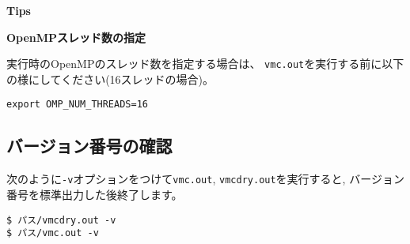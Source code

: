 \begin{screen}
\Large 
{\bf Tips}
\normalsize

{\bf OpenMPスレッド数の指定}

実行時のOpenMPのスレッド数を指定する場合は、
\verb|vmc.out|を実行する前に以下の様にしてください(16スレッドの場合)。
\begin{verbatim}
export OMP_NUM_THREADS=16
\end{verbatim}

\end{screen}

\subsection{バージョン番号の確認}

次のように\verb|-v|オプションをつけて\verb|vmc.out|, \verb|vmcdry.out|を実行すると, 
バージョン番号を標準出力した後終了します。

\begin{verbatim}
$ パス/vmcdry.out -v
$ パス/vmc.out -v
\end{verbatim}


